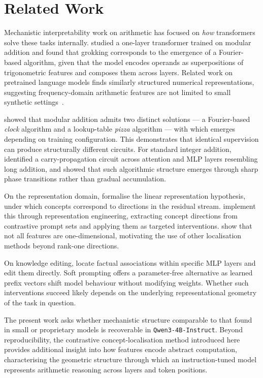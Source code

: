 \chapter{Related Work}
\label{sec:related}

Mechanistic interpretability work on arithmetic has focused on \textit{how} transformers solve 
these tasks internally. \citet{nanda2023progress} studied a one-layer transformer trained on 
modular addition and found that grokking corresponds to the emergence of a Fourier-based 
algorithm, given that the model encodes operands as superpositions of trigonometric features and composes 
them across layers. Related work on pretrained language models finds similarly structured 
numerical representations, suggesting frequency-domain arithmetic features are not limited to 
small synthetic settings~\citep{zhou2024fourier}.

\citet{zhong2023clock} showed that modular addition admits two distinct solutions --- a 
Fourier-based \textit{clock} algorithm and a lookup-table \textit{pizza} algorithm --- with which emerges 
depending on training configuration. This demonstrates that identical supervision can produce 
structurally different circuits. For standard integer addition, \citet{quirke2024understanding} 
identified a carry-propagation circuit across attention and MLP layers resembling long addition, 
and \citet{musat2024clustering} showed that such algorithmic structure emerges through sharp 
phase transitions rather than gradual accumulation.

On the representation domain, \citet{park2023linear} formalise the linear representation 
hypothesis, under which concepts correspond to directions in the residual stream. 
\citet{zou2025representationengineeringtopdownapproach} implement this through 
representation engineering, extracting concept directions from contrastive prompt sets and 
applying them as targeted interventions. \citet{engels2024notall} show that not all features 
are one-dimensional, motivating the use of other localisation methods beyond rank-one directions.

On knowledge editing, \citet{meng2023locatingeditingfactualassociations} locate factual 
associations within specific MLP layers and edit them directly. Soft prompting 
\citep{panickssery2024steeringllama2contrastive} offers a parameter-free alternative as learned 
prefix vectors shift model behaviour without modifying weights. Whether such interventions 
succeed likely depends on the underlying representational geometry of the task in question.

The present work asks whether mechanistic structure comparable to that found in small or
proprietary models is recoverable in \texttt{Qwen3-4B-Instruct}. Beyond reproducibility,
the contrastive concept-localisation method introduced here provides additional insight
into how features encode abstract computation, characterising the geometric structure
through which an instruction-tuned model represents arithmetic reasoning across layers
and token positions.